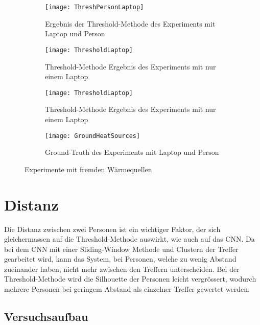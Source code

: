 \vspace{.5em}
\begin{figure}[H]
	\begin{subfigure}{.45\linewidth}
		\centering
		\texttt{[image: ThreshPersonLaptop]}
		\caption{Ergebnis der Threshold-Methode des Experiments mit Laptop und Person}
		\label{fig:ThreshPersonLaptop}
	\end{subfigure}\hfill%
	\begin{subfigure}{.45\linewidth}
		\centering
		\texttt{[image: ThresholdLaptop]}
		\caption{Threshold-Methode Ergebnis des Experiments mit nur einem Laptop}
		\label{fig:thresholdDistanice10}
	\end{subfigure}
\begin{subfigure}{.45\linewidth}
	\centering
	\texttt{[image: ThresholdLaptop]}
	\caption{Threshold-Methode Ergebnis des Experiments mit nur einem Laptop}
	\label{fig:thresholdDistanice10}
\end{subfigure}
	\begin{subfigure}{.55\linewidth}
		\centering
		\texttt{[image: GroundHeatSources]}
		\caption{Ground-Truth des Experiments mit Laptop und Person}
		\label{fig:groundDiistance10}
	\end{subfigure}
	\caption{Experimente mit fremden Wärmequellen}
	\label{fig:HeatSources}
\end{figure}
\vspace{.5em}



\section{Distanz}
\label{sec:distanz}

Die Distanz zwischen zwei Personen ist ein wichtiger Faktor, der sich gleichermassen auf die Threshold-Methode auswirkt, wie auch auf das \gls{CNN}. Da bei dem \gls{CNN} mit einer Sliding-Window Methode und Clustern der Treffer gearbeitet wird, kann das System, bei Personen, welche zu wenig Abstand zueinander haben, nicht mehr zwischen den Treffern unterscheiden. Bei der Threshold-Methode wird die Silhouette der Personen leicht vergrössert, wodurch mehrere Personen bei geringem Abstand als einzelner Treffer gewertet werden.

\subsection{Versuchsaufbau}

